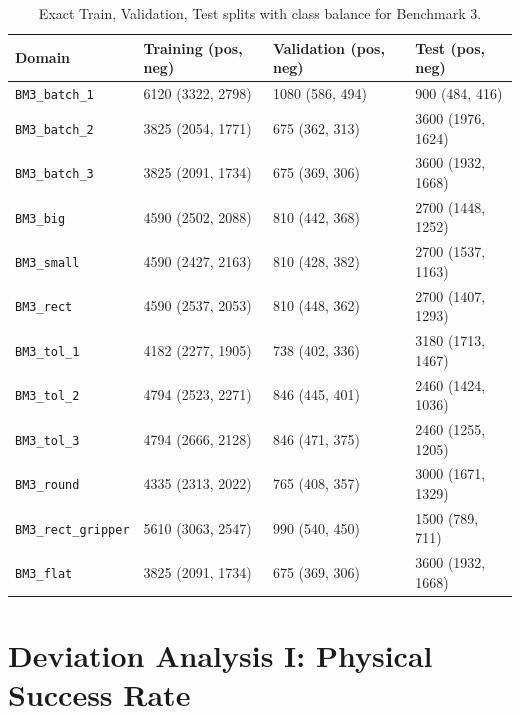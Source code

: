 \begin{table}[htbp]
    \centering
    \caption{Exact Train, Validation, Test splits with class balance for Benchmark 3.}
    \label{tab:bm3_data_split}
    \begin{tabular}{llll}
        \toprule
        \textbf{Domain} & \textbf{Training (pos, neg)} & \textbf{Validation (pos, neg)} & \textbf{Test (pos, neg)}\\
        \midrule

        \texttt{BM3\_batch\_1} & 6120 (3322, 2798) & 1080 (586, 494) & 900 (484, 416) \\
        \texttt{BM3\_batch\_2} & 3825 (2054, 1771) & 675 (362, 313) & 3600 (1976, 1624) \\
        \texttt{BM3\_batch\_3} & 3825 (2091, 1734) & 675 (369, 306) & 3600 (1932, 1668) \\

        \texttt{BM3\_big} & 4590 (2502, 2088) & 810 (442, 368) & 2700 (1448, 1252) \\
        \texttt{BM3\_small} & 4590 (2427, 2163) & 810 (428, 382) & 2700 (1537, 1163) \\
        \texttt{BM3\_rect} & 4590 (2537, 2053) & 810 (448, 362) & 2700 (1407, 1293) \\

        \texttt{BM3\_tol\_1} & 4182 (2277, 1905) & 738 (402, 336) & 3180 (1713, 1467) \\
        \texttt{BM3\_tol\_2} & 4794 (2523, 2271) & 846 (445, 401) & 2460 (1424, 1036) \\
        \texttt{BM3\_tol\_3} & 4794 (2666, 2128) & 846 (471, 375) & 2460 (1255, 1205) \\

        \texttt{BM3\_round} & 4335 (2313, 2022) & 765 (408, 357) & 3000 (1671, 1329) \\
        \texttt{BM3\_rect\_gripper} & 5610 (3063, 2547) & 990 (540, 450) & 1500 (789, 711) \\
        \texttt{BM3\_flat} & 3825 (2091, 1734) & 675 (369, 306) & 3600 (1932, 1668) \\
        \bottomrule
    \end{tabular}
\end{table}

\newpage
\section{Deviation Analysis I: Physical Success Rate}
\label{sec:results_deviation_analysis_1}

